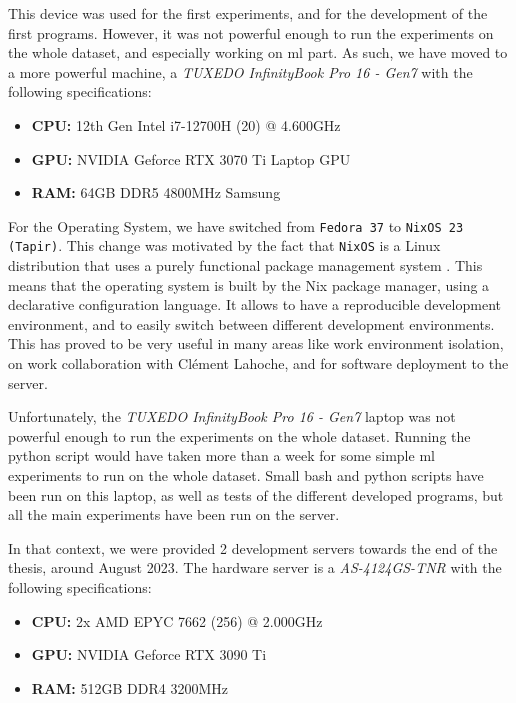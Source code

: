     This device was used for the first experiments, and for the development of the first programs. However, it was not powerful enough to run the experiments on the whole dataset, and especially working on \acrshort{ml} part. As such, we have moved to a more powerful machine, a \textit{TUXEDO InfinityBook Pro 16 - Gen7} with the following specifications:

    \begin{itemize}
        \item \textbf{CPU:} 12th Gen Intel i7-12700H (20) @ 4.600GHz
        \item \textbf{GPU:} NVIDIA Geforce RTX 3070 Ti Laptop GPU
        \item \textbf{RAM:} 64GB DDR5 4800MHz Samsung
    \end{itemize}

    For the Operating System, we have switched from \texttt{Fedora 37} to \texttt{NixOS 23 (Tapir)}. This change was motivated by the fact that \texttt{NixOS} is a Linux distribution that uses a purely functional package management system \cite{NixOS08}. This means that the operating system is built by the Nix package manager, using a declarative configuration language. It allows to have a reproducible development environment, and to easily switch between different development environments. This has proved to be very useful in many areas like work environment isolation, on work collaboration with Clément Lahoche, and for software deployment to the server.
    
    Unfortunately, the \textit{TUXEDO InfinityBook Pro 16 - Gen7} laptop was not powerful enough to run the experiments on the whole dataset. Running the python script would have taken more than a week for some simple \acrshort{ml} experiments to run on the whole dataset. Small bash and python scripts have been run on this laptop, as well as tests of the different developed programs, but all the main experiments have been run on the server.
    
    In that context, we were provided 2 development servers towards the end of the thesis, around August 2023. The hardware server is a \textit{AS-4124GS-TNR} with the following specifications:

    \begin{itemize}
        \item \textbf{CPU:} 2x AMD EPYC 7662 (256) @ 2.000GHz
        \item \textbf{GPU:} NVIDIA Geforce RTX 3090 Ti
        \item \textbf{RAM:} 512GB DDR4 3200MHz
    \end{itemize}

